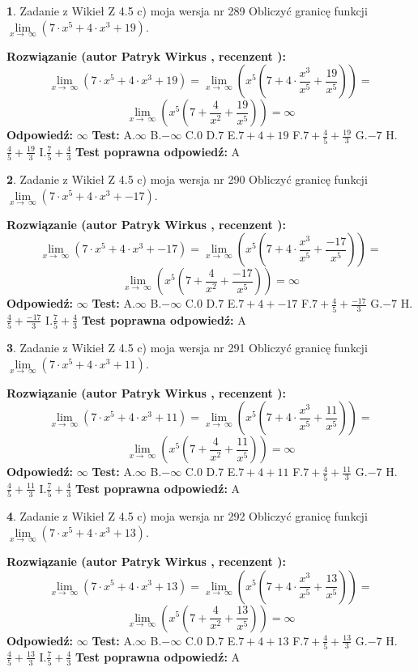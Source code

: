 \documentclass[12pt, a4paper]{article}
\theoremstyle{definition} %
\newtheorem{zad}{}
\newcommand{\zadStart}[1]{\begin{zad}#1\newline}
\newcommand{\zadStop}{\end{zad}}
\newcommand{\rozwStart}[2]{\noindent \textbf{Rozwiązanie (autor #1 , recenzent #2): }\newline}
\newcommand{\rozwStop}{\newline}
\newcommand{\odpStart}{\noindent \textbf{Odpowiedź:}\newline}
\newcommand{\odpStop}{\newline}
\newcommand{\testStart}{\noindent \textbf{Test:}\newline}
\newcommand{\testStop}{\newline}
\newcommand{\kluczStart}{\noindent \textbf{Test poprawna odpowiedź:}\newline}
\newcommand{\kluczStop}{\newline}
\begin{document}
\zadStart{Zadanie z Wikieł Z 4.5 c) moja wersja nr 289}
Obliczyć granicę funkcji  $\lim\limits_{x\to\ \infty}(7 \cdot x^{5}+4 \cdot x^{3}+19)$.
\zadStop
\rozwStart{Patryk Wirkus}{}
$$\lim\limits_{x\to\ \infty}(7 \cdot x^{5}+4 \cdot x^{3}+19) = \lim\limits_{x\to\ \infty}(x^{5}(7 +4 \cdot \frac{x^{3}}{x^{5}}+\frac{19}{x^{5}})) =$$ $$\lim\limits_{x\to\ \infty}(x^{5}(7 +\frac{4}{x^{2}}+\frac{19}{x^{5}})) =\infty$$
\rozwStop
\odpStart
$\infty$
\odpStop
\testStart
A.$\infty$ B.$-\infty$ C.$0$ D.$7$ E.$7 + 4 + 19$
F.$7+\frac{4}{5}+\frac{19}{3}$ G.$-7$
H.$\frac{4}{5}+\frac{19}{3}$
I.$\frac{7}{5}+\frac{4}{3}$
\testStop
\kluczStart
A
\kluczStop



\zadStart{Zadanie z Wikieł Z 4.5 c) moja wersja nr 290}
Obliczyć granicę funkcji  $\lim\limits_{x\to\ \infty}(7 \cdot x^{5}+4 \cdot x^{3}+-17)$.
\zadStop
\rozwStart{Patryk Wirkus}{}
$$\lim\limits_{x\to\ \infty}(7 \cdot x^{5}+4 \cdot x^{3}+-17) = \lim\limits_{x\to\ \infty}(x^{5}(7 +4 \cdot \frac{x^{3}}{x^{5}}+\frac{-17}{x^{5}})) =$$ $$\lim\limits_{x\to\ \infty}(x^{5}(7 +\frac{4}{x^{2}}+\frac{-17}{x^{5}})) =\infty$$
\rozwStop
\odpStart
$\infty$
\odpStop
\testStart
A.$\infty$ B.$-\infty$ C.$0$ D.$7$ E.$7 + 4 + -17$
F.$7+\frac{4}{5}+\frac{-17}{3}$ G.$-7$
H.$\frac{4}{5}+\frac{-17}{3}$
I.$\frac{7}{5}+\frac{4}{3}$
\testStop
\kluczStart
A
\kluczStop



\zadStart{Zadanie z Wikieł Z 4.5 c) moja wersja nr 291}
Obliczyć granicę funkcji  $\lim\limits_{x\to\ \infty}(7 \cdot x^{5}+4 \cdot x^{3}+11)$.
\zadStop
\rozwStart{Patryk Wirkus}{}
$$\lim\limits_{x\to\ \infty}(7 \cdot x^{5}+4 \cdot x^{3}+11) = \lim\limits_{x\to\ \infty}(x^{5}(7 +4 \cdot \frac{x^{3}}{x^{5}}+\frac{11}{x^{5}})) =$$ $$\lim\limits_{x\to\ \infty}(x^{5}(7 +\frac{4}{x^{2}}+\frac{11}{x^{5}})) =\infty$$
\rozwStop
\odpStart
$\infty$
\odpStop
\testStart
A.$\infty$ B.$-\infty$ C.$0$ D.$7$ E.$7 + 4 + 11$
F.$7+\frac{4}{5}+\frac{11}{3}$ G.$-7$
H.$\frac{4}{5}+\frac{11}{3}$
I.$\frac{7}{5}+\frac{4}{3}$
\testStop
\kluczStart
A
\kluczStop



\zadStart{Zadanie z Wikieł Z 4.5 c) moja wersja nr 292}
Obliczyć granicę funkcji  $\lim\limits_{x\to\ \infty}(7 \cdot x^{5}+4 \cdot x^{3}+13)$.
\zadStop
\rozwStart{Patryk Wirkus}{}
$$\lim\limits_{x\to\ \infty}(7 \cdot x^{5}+4 \cdot x^{3}+13) = \lim\limits_{x\to\ \infty}(x^{5}(7 +4 \cdot \frac{x^{3}}{x^{5}}+\frac{13}{x^{5}})) =$$ $$\lim\limits_{x\to\ \infty}(x^{5}(7 +\frac{4}{x^{2}}+\frac{13}{x^{5}})) =\infty$$
\rozwStop
\odpStart
$\infty$
\odpStop
\testStart
A.$\infty$ B.$-\infty$ C.$0$ D.$7$ E.$7 + 4 + 13$
F.$7+\frac{4}{5}+\frac{13}{3}$ G.$-7$
H.$\frac{4}{5}+\frac{13}{3}$
I.$\frac{7}{5}+\frac{4}{3}$
\testStop
\kluczStart
A
\kluczStop
\end{document}
